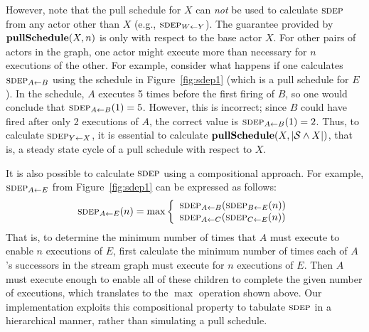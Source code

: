 However, note that the pull schedule for $X$ can {\it not} be used to
calculate $\textsc{sdep}$ from any actor other than $X$ (e.g.,
$\textsc{sdep}_{W \small{\leftarrow} Y}$).  The guarantee provided by ${\bf pullSchedule}(X, n)$
is only with respect to the base actor $X$. For other pairs of actors
in the graph, one actor might execute more than necessary for $n$
executions of the other.  For example, consider what happens if one
calculates $\textsc{sdep}_{A \small{\leftarrow} B}$ using the schedule in Figure~\ref{fig:sdep1}
(which is a pull schedule for $E$).  In the schedule, $A$ executes 5
times before the first firing of $B$, so one would conclude that
$\textsc{sdep}_{A \small{\leftarrow} B}(1) = 5$.  However, this is incorrect; since $B$ could
have fired after only 2 executions of $A$, the correct value is
$\textsc{sdep}_{A \small{\leftarrow} B}(1) = 2$.  Thus, to calculate $\textsc{sdep}_{Y \small{\leftarrow} X}$, it is
essential to calculate ${\bf pullSchedule}(X, |{\cal S} \wedge X|)$,
that is, a steady state cycle of a pull schedule with respect to $X$.

It is also possible to calculate $\textsc{sdep}$ using a compositional
approach.  For example, $\textsc{sdep}_{A \small{\leftarrow} E}$ from Figure~\ref{fig:sdep1} can
be expressed as follows: ~\vspace{-3pt}~
\begin{equation*}
\begin{array}{rl}
\textsc{sdep}_{A \small{\leftarrow} E}(n) = \max \left\{\begin{array}{l}
\textsc{sdep}_{A \small{\leftarrow} B} ( \textsc{sdep}_{B \small{\leftarrow} E}(n) ) \\
\textsc{sdep}_{A \small{\leftarrow} C} ( \textsc{sdep}_{C \small{\leftarrow} E}(n) )
\end{array}\right.
\end{array}
\end{equation*}
That is, to determine the minimum number of times that $A$ must
execute to enable $n$ executions of $E$, first calculate the minimum
number of times each of $A$'s successors in the stream graph must
execute for $n$ executions of $E$.  Then $A$ must execute enough to
enable all of these children to complete the given number of
executions, which translates to the $\max$ operation shown above.  Our
implementation exploits this compositional property to tabulate
$\textsc{sdep}$ in a hierarchical manner, rather than simulating a pull
schedule.


